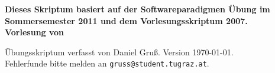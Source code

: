 
\thispagestyle{empty}

\begin{center}
\vspace*{5cm}
\huge{\textbf{\titel}}

\vspace*{1cm}

\large{\textbf{Dieses Skriptum basiert auf der Softwareparadigmen Übung im Sommersemester 2011 und dem Vorlesungsskriptum 2007.\\Vorlesung von \vortragender}}
\end{center}
\clearpage

\begin{center}
Übungsskriptum verfasst von Daniel Gruß. Version \today. \\
Fehlerfunde bitte melden an \verb|gruss@student.tugraz.at|.
\end{center}
\clearpage

\tableofcontents
\cleardoublepage

